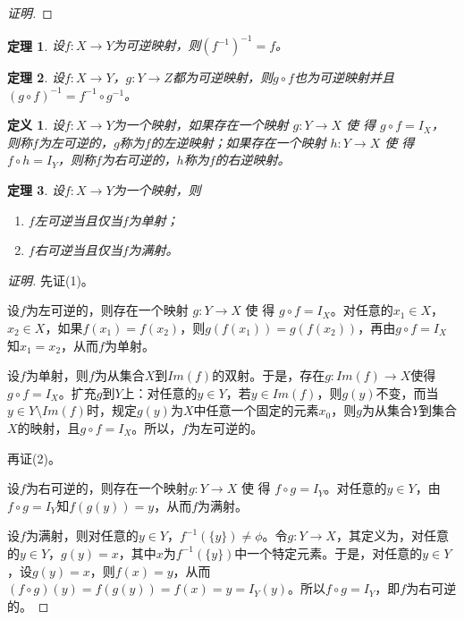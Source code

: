 \documentclass{article}
\newtheorem{Def}{定义}
\newtheorem{Thm}{定理}
\begin{document}
\begin{CJK*}{UTF8}{gbsn}
\begin{proof}[证明]
 \end{proof}
 \begin{Thm}
    设$f:X\to Y$为可逆映射，则$(f^{-1})^{-1}=f$。
  \end{Thm}
  \begin{Thm}
    设$f:X\to Y$，$g:Y\to Z$都为可逆映射，则$g\circ f$也为可逆映射并且$(g\circ f)^{-1} = f^{-1}\circ g^{-1}$。
  \end{Thm}

    \begin{Def}
    设$f:X\to Y$为一个映射，如果存在一个映射 $g:Y\to X$ 使 得 $g\circ f = I_X$，
    则称$f$为左可逆的，$g$称为$f$的左逆映射；如果存在一个映射
    $h:Y\to X$ 使 得 $f\circ h=I_Y$，则称$f$为右可逆的，$h$称为$f$的右逆映射。
  \end{Def}
  \begin{Thm}
    设$f:X\to Y$为一个映射，则
    \begin{enumerate}
    \item $f$左可逆当且仅当$f$为单射；
    \item $f$右可逆当且仅当$f$为满射。
    \end{enumerate}
  \end{Thm}
  \begin{proof}[证明]
    先证(1)。

设$f$为左可逆的，则存在一个映射 $g:Y\to X$ 使 得 $g\circ f = I_X$。对任意的$x_1\in X$，$x_2\in X$，如果$f(x_1)=f(x_2)$，则$g(f(x_1))=g(f(x_2))$，再由$g\circ f = I_{X}$知$x_1=x_2$，从而$f$为单射。

设$f$为单射，则$f$为从集合$X$到$Im(f)$的双射。于是，存在$g:Im(f)\to X$使得$g\circ f = I_X$。扩充$g$到$Y$上：对任意的$y\in Y$，若$y\in  Im(f)$，则$g(y)$不变，而当$y\in Y\setminus Im(f)$时，规定$g(y)$为$X$中任意一个固定的元素$x_0$，则$g$为从集合$Y$到集合$X$的映射，且$g\circ f = I_X$。所以，$f$为左可逆的。

再证(2)。

设$f$为右可逆的，则存在一个映射$g:Y\to X$ 使 得 $f\circ g=I_Y$。对任意的$y\in Y$，由$f\circ g = I_{Y}$知$f(g(y))=y$，从而$f$为满射。

设$f$为满射，则对任意的$y\in Y$，$f^{-1}(\{y\})\neq \phi$。令$g:Y\to X$，其定义为，对任意的$y\in Y$，$g(y)=x$，其中$x$为$f^{-1}(\{y\})$中一个特定元素。于是，对任意的$y\in Y$，设$g(y)=x$，则$f(x)=y$，从而$(f\circ g)(y) = f(g(y)) = f(x) = y = I_Y(y)$。所以$f\circ g=I_Y$，即$f$为右可逆的。
  \end{proof}


\end{CJK*}
\end{document}
